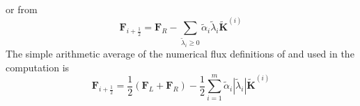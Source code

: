 or from
\begin{equation}\label{eqn:Fsum2}
	\boldsymbol{F}_{i+\frac{1}{2}} = \boldsymbol{F}_R - \sum_{\tilde{\lambda}_i \ge 0} \tilde{\alpha}_i  \tilde{\lambda}_i  \tilde{\boldsymbol{K}}^{\left(i\right)}
\end{equation}
The simple arithmetic average of the numerical flux definitions of  and  used in the computation is
\begin{equation}\label{eqn:NumericalFluxAverage}
	\boldsymbol{F}_{i+\frac{1}{2}} = \frac{1}{2} \left( \boldsymbol{F}_L + \boldsymbol{F}_R \right)- \frac{1}{2}\sum_{i = 1}^{m} \tilde{\alpha}_i  |\tilde{\lambda}_i |  \tilde{\boldsymbol{K}}^{\left(i\right)}
\end{equation}